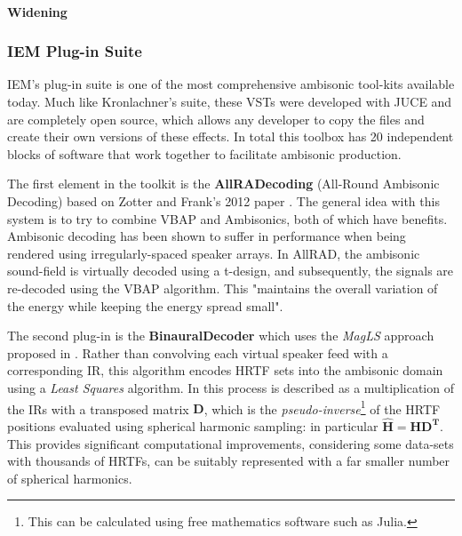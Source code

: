 \paragraph{Widening}


\subsubsection{IEM Plug-in Suite}

IEM's plug-in suite is one of the most comprehensive ambisonic tool-kits available today. Much like Kronlachner's suite, these VSTs were developed with JUCE and are completely open source, which allows any developer to copy the files and create their own versions of these effects. In total this toolbox has 20 independent blocks of software that work together to facilitate ambisonic production. 

The first element in the toolkit is the \textbf{AllRADecoding} (All-Round Ambisonic Decoding) based on Zotter and Frank's 2012 paper \cite{zotter2012all}. The general idea with this system is to try to combine VBAP and Ambisonics, both of which have benefits. Ambisonic decoding has been shown to suffer in performance when being rendered using irregularly-spaced speaker arrays. In AllRAD, the ambisonic sound-field is virtually decoded using a t-design, and subsequently, the signals are re-decoded using the VBAP algorithm. This "maintains the overall variation of the energy while keeping the energy spread small". 

The second plug-in is the \textbf{BinauralDecoder} which uses the \textit{MagLS} approach proposed in \cite{schorkhuber2018binaural}. Rather than convolving each virtual speaker feed with a corresponding IR, this algorithm encodes HRTF sets into the ambisonic domain using a \textit{Least Squares} algorithm. In \cite{gorzel2019efficient} this process is described as a multiplication of the IRs with a transposed matrix $\mathbf{D}$, which is the \textit{pseudo-inverse}\footnote{This can be calculated using free mathematics software such as Julia.} of the HRTF positions evaluated using spherical harmonic sampling: in particular $\hat{\mathbf{H}}=\mathbf{H D}^{\mathbf{T}}$. This provides significant computational improvements, considering some data-sets with thousands of HRTFs, can be suitably represented with a far smaller number of spherical harmonics. 

